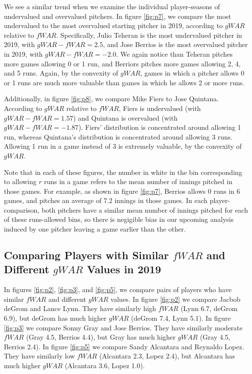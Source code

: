 \documentclass[12pt]{article}
\begin{document}
We see a similar trend when we examine the individual player-seasons of undervalued and overvalued pitchers. In figure \ref{fig:p7}, we compare the most undervalued to the most overvalued starting pitcher in 2019, according to $gWAR$ relative to $fWAR$. Specifically, Julio Teheran is the most undervalued pitcher in 2019, with $gWAR - fWAR = 2.5$, and Jose Berrios is the most overvalued pitcher in 2019, with $gWAR - fWAR = -2.0$. We again notice than Teheran pitches more games allowing 0 or 1 run, and Berriors pitches more games allowing 2, 4, and 5 runs. Again, by the convexity of $gWAR$, games in which a pitcher allows 0 or 1 runs are much more valuable than games in which he allows 2 or more runs. 

Additionally, in figure \ref{fig:p8}, we compare Mike Fiers to Jose Quintana. According to $gWAR$ relative to $fWAR$, Fiers is undervalued (with $gWAR - fWAR = 1.57$) and Quintana is overvalued (with $gWAR - fWAR = -1.87$). Fiers' distribution is concentrated around allowing 1 run, whereas Quintana's distribution is concentrated around allowing 3 runs. Allowing 1 run in a game instead of 3 is extremely valuable, by the convexity of $gWAR$. 

Note that in each of these figures, the number in white in the bin corresponding to allowing $r$ runs in a game refers to the mean number of innings pitched in those games. For example, as shown in figure \ref{fig:p7}, Berrios allows 0 runs in 6 games, and pitches an average of 7.2 innings in those games. In each player-comparison, both pitchers have a similar mean number of innings pitched for each of these runs-allowed bins, so there is negigible bias in our upcoming analysis induced by one pitcher leaving a game earlier than the other. 

\subsection{Comparing Players with Similar $fWAR$ and Different $gWAR$ Values in 2019}

In figures \ref{fig:p2}, \ref{fig:p3}, and \ref{fig:p5}, we compare pairs of players who have similar $fWAR$ and different $gWAR$ values. In figure \ref{fig:p2} we compare Jacbob deGrom and Lance Lynn. They have similarly high $fWAR$ (Lynn 6.7, deGrom 6.9), but deGrom has much higher $gWAR$ (deGrom 7.4, Lynn 5.1). In figure \ref{fig:p3} we compare Sonny Gray and Jose Berrios. They have similarly moderate $fWAR$ (Gray 4.5, Berrios 4.4), but Gray has much higher $gWAR$ (Gray 4.5, Berrios 2.4). In figure \ref{fig:p5} we compare Sandy Alcantara and Reynaldo Lopez. They have similarly low $fWAR$ (Alcantara 2.3, Lopez 2.4), but Alcantara has much higher $gWAR$ (Alcantara 3.6, Lopez 1.0). 
\end{document}
